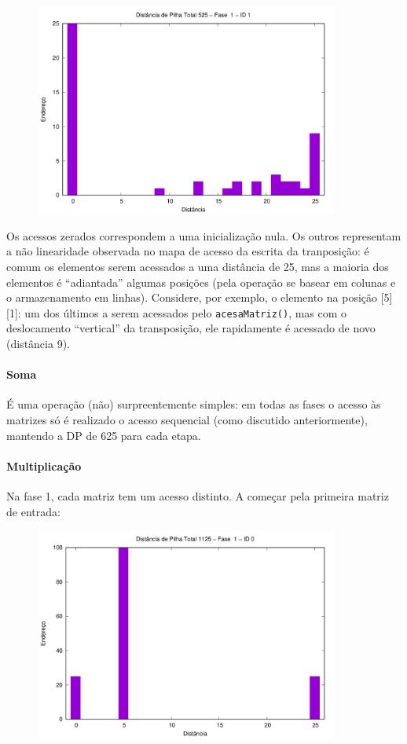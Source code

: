 \documentclass{article}
\def\code#1{\texttt{#1}}
\begin{document}
\begin{figure} [H]
    \includegraphics[width=10cm]{t-hist-1-1.png} 
    \centering
\end{figure}

Os acessos zerados correspondem a uma inicialização nula. Os outros representam a não linearidade observada no mapa de acesso da escrita da tranposição: é comum os elementos serem acessados a uma distância de 25, mas a maioria dos elementos é ``adiantada'' algumas posições (pela operação se basear em colunas e o armazenamento em linhas). Considere, por exemplo, o elemento na posição [5][1]: um dos últimos a serem acessados pelo \code{acesaMatriz()}, mas com o deslocamento ``vertical'' da transposição, ele rapidamente é acessado de novo (distância 9).

\paragraph{Soma} É uma operação (não) surpreentemente simples: em todas as fases o acesso às matrizes só é realizado o acesso sequencial (como discutido anteriormente), mantendo a DP de 625 para cada etapa.

\paragraph{Multiplicação} Na fase 1, cada matriz tem um acesso distinto. A começar pela primeira matriz de entrada:

\begin{figure} [H]
    \includegraphics[width=10cm]{m-hist-1-0.png} 
    \centering
\end{figure}
\end{document}
